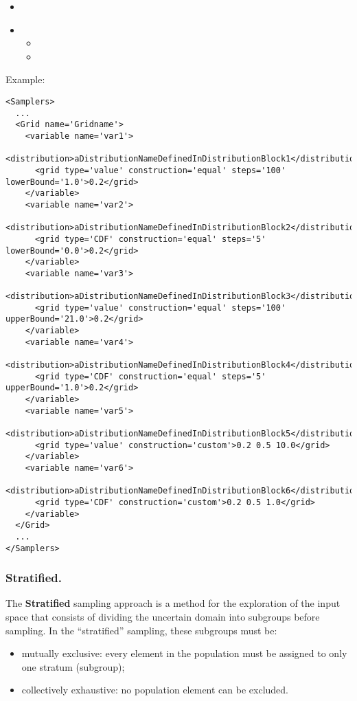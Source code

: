 %
\attrIntro
\begin{itemize}
\itemsep0em
\item \nameDescription
\end{itemize}
\begin{itemize}
\item \variableDescription
 \subnodesIntro
 \begin{itemize}
    \item \distributionDescription
    \item \gridDescription
  \end{itemize}
\end{itemize}

Example:
\begin{lstlisting}[style=XML,morekeywords={construction,steps,lowerBound,upperBound}]
<Samplers>
  ...
  <Grid name='Gridname'> 
    <variable name='var1'> 
      <distribution>aDistributionNameDefinedInDistributionBlock1</distribution> 
      <grid	type='value' construction='equal' steps='100' lowerBound='1.0'>0.2</grid>	
    </variable> 
    <variable name='var2'> 
      <distribution>aDistributionNameDefinedInDistributionBlock2</distribution> 
      <grid	type='CDF' construction='equal' steps='5' lowerBound='0.0'>0.2</grid>	
    </variable>
    <variable name='var3'> 
      <distribution>aDistributionNameDefinedInDistributionBlock3</distribution> 
      <grid	type='value' construction='equal' steps='100' upperBound='21.0'>0.2</grid>	
    </variable> 
    <variable name='var4'> 
      <distribution>aDistributionNameDefinedInDistributionBlock4</distribution> 
      <grid	type='CDF' construction='equal' steps='5' upperBound='1.0'>0.2</grid>	
    </variable>
    <variable name='var5'> 
      <distribution>aDistributionNameDefinedInDistributionBlock5</distribution> 
      <grid	type='value' construction='custom'>0.2 0.5 10.0</grid>	
    </variable> 
    <variable name='var6'> 
      <distribution>aDistributionNameDefinedInDistributionBlock6</distribution> 
      <grid	type='CDF' construction='custom'>0.2 0.5 1.0</grid>	
    </variable>
  </Grid>
  ...
</Samplers>
\end{lstlisting}

\subsubsection{Stratified.}
\label{subsubsubsec:Stratified}
The \textbf{Stratified} sampling approach is a method for the exploration of the
input space that consists of dividing the uncertain domain into subgroups before
sampling.
%
In the ``stratified'' sampling, these subgroups must be:
\begin{itemize}
 \item mutually exclusive: every element in the population must be assigned to
   only one stratum (subgroup);
 \item collectively exhaustive: no population element can be excluded.
\end{itemize}


